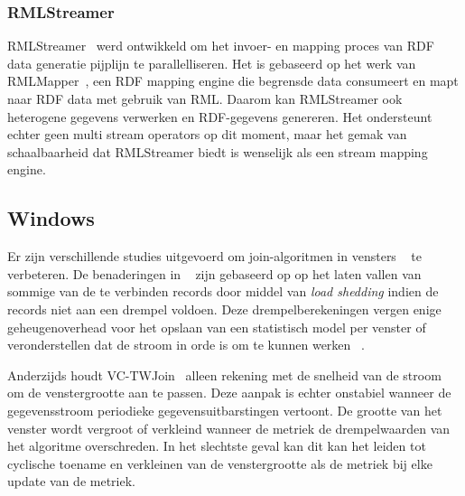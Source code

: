 \subsubsection{RMLStreamer}
RMLStreamer~\cite{rml_streamer}
werd ontwikkeld om het invoer- en mapping proces van RDF data generatie pijplijn te parallelliseren. 
Het is gebaseerd op het werk van RMLMapper~\cite{rml}, een RDF mapping engine die begrensde data consumeert en mapt naar RDF data met gebruik van RML. Daarom kan RMLStreamer ook 
heterogene gegevens verwerken en RDF-gegevens genereren. Het ondersteunt echter geen 
multi stream operators op dit moment, maar het gemak van schaalbaarheid dat RMLStreamer biedt
is wenselijk als een stream mapping engine. 


\subsection{Windows}
Er zijn verschillende studies uitgevoerd om 
join-algoritmen in vensters ~\cite{vctw_join, join_tracking, grubjoin, approximate_window_sem, approx_window} te verbeteren. 
De benaderingen in ~\cite{grubjoin, approximate_window_sem, approx_window} zijn gebaseerd op 
op het laten vallen van sommige van de te verbinden records door middel van \emph{load shedding} indien de 
records niet aan een drempel voldoen. Deze drempelberekeningen vergen enige 
geheugenoverhead voor het opslaan van een statistisch model per venster of 
veronderstellen dat de stroom in orde is om te kunnen werken
~\cite{grubjoin, approximate_window_sem, approx_window}.

Anderzijds houdt VC-TWJoin~\cite{vctw_join} alleen rekening met de snelheid van de 
stroom om de venstergrootte aan te passen. 
Deze aanpak is echter onstabiel wanneer de gegevensstroom periodieke gegevensuitbarstingen vertoont.
De grootte van het venster wordt vergroot of verkleind wanneer de metriek 
de drempelwaarden van het algoritme overschreden. In het slechtste geval kan dit 
kan het leiden tot cyclische toename en 
verkleinen van de venstergrootte als de metriek bij elke 
update van de metriek.




